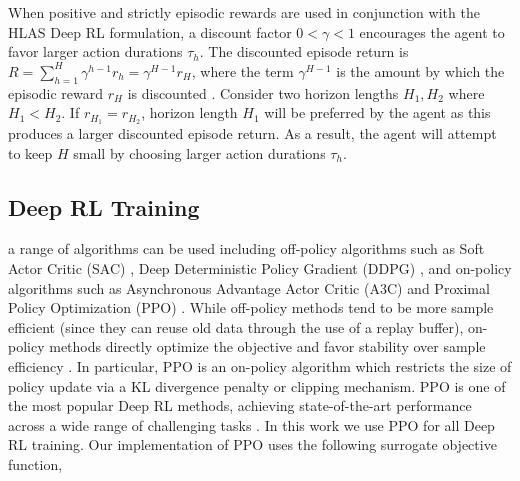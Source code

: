 \documentclass{UnderReview}
\begin{document}
When positive and strictly episodic rewards are used in conjunction with the HLAS Deep RL formulation, a discount factor $0 < \gamma < 1$ encourages the agent to favor larger action durations $\tau_h$.  The discounted episode return is $R=\sum_{h=1}^{H} \gamma^{h-1}r_h = \gamma^{H-1} r_H$, where the term $\gamma^{H-1}$ is the amount by which the episodic reward $r_H$ is discounted .  Consider two horizon lengths $H_1, H_2$ where $H_1<H_2$.  If $r_{H_1} = r_{H_2}$, horizon length $H_1$ will be preferred by the agent as this produces a larger discounted episode return.  As a result, the agent will attempt to keep $H$ small by choosing larger action durations $\tau_h$.  


\subsection{Deep RL Training}\label{section:RLTrainingSetup}
 a range of algorithms can be used including off-policy algorithms such as Soft Actor Critic (SAC) \cite{haarnoja2018soft}, Deep Deterministic Policy Gradient (DDPG) \cite{silver2014deterministic}, 
and on-policy algorithms such as 
%
%
Asynchronous Advantage Actor Critic (A3C) \cite{mnih2016asynchronous} and Proximal Policy Optimization (PPO) \cite{schulman2017proximal}.  While off-policy methods tend to be more sample efficient (since they can reuse old data through the use of a replay buffer), on-policy methods directly optimize the objective and favor stability over sample efficiency \cite{SpinningUp2018,tang2020discretizing}.  
In particular, PPO is an on-policy algorithm which restricts the size of policy update via a KL divergence penalty or clipping mechanism.  PPO is one of the most popular Deep RL methods, achieving state-of-the-art performance across a wide range of challenging tasks \cite{wang2019trust,schulman2017proximal}.  In this work we use PPO for all Deep RL training.  Our implementation of PPO uses the following surrogate objective function, 
\end{document}
